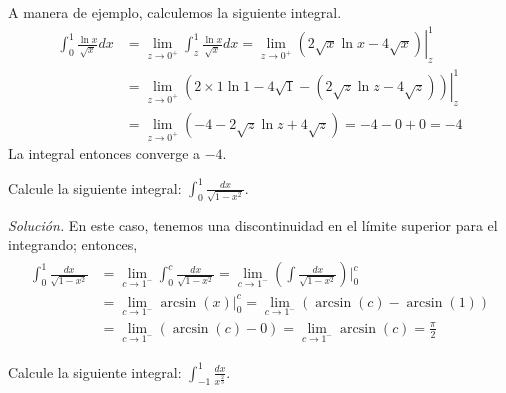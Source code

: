 \begin{ejemplo}
  A manera de ejemplo, calculemos la siguiente integral.
  \begin{align*}
    \int_{0}^{1}\frac{\ln x}{\sqrt{x}}dx&=\lim_{z\rightarrow 0^{+}}\int_{z}^{1}%
    \frac{\ln x}{\sqrt{x}}dx=\lim_{z\rightarrow 0^{+}}\left.\left( 2\sqrt{x}\ln x-4\sqrt{x}\right)\right\vert_{z}^{1}\\
    &=\lim_{z\rightarrow 0^{+}}\left.\left( 2\times 1\ln 1-4\sqrt{1}-\left( 2\sqrt{z}\ln z-4\sqrt{z}\right) \right)\right\vert_{z}^{1}\\
    &=\lim_{z\rightarrow 0^{+}}\left( -4-2\sqrt{z}\ln z+4\sqrt{z}\right)
    =-4-0+0=-4
  \end{align*}
  La integral entonces converge a $-4$.
\end{ejemplo}

\begin{ejemplo}
  Calcule la siguiente integral: $\int_{0}^{1}\frac{dx}{\sqrt{1-x^{2}}}$.
\end{ejemplo}

\emph{Solución.} En este caso, tenemos una discontinuidad en el límite superior para el integrando; entonces,
\begin{gather*}
  \begin{aligned}
    \int_{0}^{1}\frac{dx}{\sqrt{1-x^{2}}}&={\lim_{c\to 1^{-}} \int_{0}^{c}\frac{dx}{\sqrt{1-x^{2}}}} =\lim_{c\to 1^{-}} \left( \int \frac{dx}{\sqrt{1-x^{2}}}\right)\Bigg|_{0}^{c}\\
    &=\lim_{c\to 1^{-}}\arcsin (x)\big| _{0}^{c}
    =\lim_{c\to 1^{-}}\left( \arcsin (c)-\arcsin (1)\right)\\
    &=\lim_{c\to 1^{-}}\left( \arcsin (c)-0\right)
    =\lim_{c\to 1^{-}}\arcsin (c)=\frac{\pi }{2}
  \end{aligned}
\end{gather*}

\begin{ejemplo}
  Calcule la siguiente integral: $\int_{-1}^{1}\frac{dx}{x^{\frac{2}{3}}}$.
\end{ejemplo}

